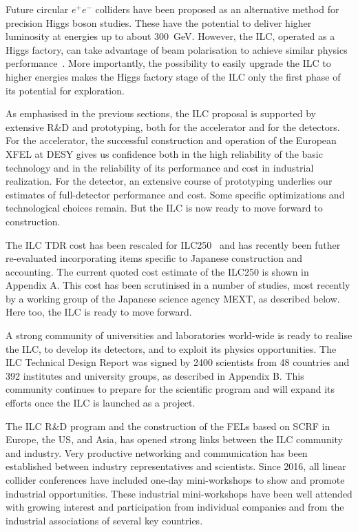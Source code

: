 \documentclass[%
 reprint,
 amsmath,amssymb,
 aps,
]{revtex4-1}
\def\ee{e^+e^-}
\begin{document}
Future circular $\ee$ colliders have been proposed as an alternative 
method for precision Higgs boson studies.  These have the potential to
deliver higher luminosity at energies up to about 300~GeV.  However,
the ILC, operated as a Higgs factory, can take advantage of  beam 
polarisation to achieve similar physics
performance~\cite{Barklow:2017suo}.
More importantly, the possibility to easily upgrade the ILC to higher
energies makes the Higgs factory stage of the  ILC  only
the first phase of its potential for exploration. 

As emphasised in the previous sections, the ILC proposal
is supported by extensive R\&D and prototyping, both for the
accelerator and for the detectors.  For the accelerator,  
the successful construction and
operation 
of the European XFEL at DESY gives
us confidence both in the high reliability of the basic
technology and in the reliability of its performance and cost in 
industrial realization.   For the detector, an extensive course of
prototyping underlies our estimates of full-detector performance 
and cost.  Some specific optimizations and technological choices remain.
But the ILC is now ready to move forward to construction. 

 The ILC TDR
cost has been 
 rescaled for ILC250~\cite{Evans:2017rvt} and has recently been futher
 re-evaluated incorporating items specific to Japanese construction
 and accounting.  The current quoted cost estimate 
of the ILC250 is shown in Appendix A. 
 This cost has  been scrutinised in a number of
studies, most recently by a working group of the Japanese science
agency MEXT, as described below.  Here too, the ILC is ready to move forward.

A strong community of universities and laboratories world-wide is
ready to realise the ILC, to develop its detectors, and to exploit its
physics opportunities. 
 The ILC Technical Design Report was signed by
2400 scientists from 48 countries and 392 institutes and university
groups,
 as described in Appendix B.  This community continues
 to prepare for the scientific program and
will expand its efforts once the ILC is launched as a project.
 
The ILC R\&D program and the construction of the FELs based on
SCRF in Europe, the US, and Asia, has opened strong links between the ILC
community 
and industry.  Very productive
 networking and communication has been established between industry
 representatives and scientists. Since 2016,
 all linear collider conferences have included one-day mini-workshops
 to show and promote industrial opportunities. 
These industrial mini-workshops have been well attended
 with growing  interest and participation from individual companies and from the industrial associations of several key countries.
 
\end{document}
